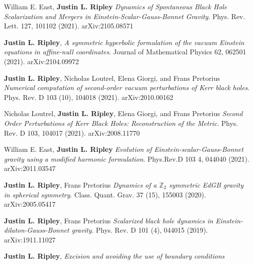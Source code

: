 \documentclass{my_cv}
\begin{document}
\begin{etaremune}
\item William E. East, {\bf Justin L. Ripley} 
   \emph{Dynamics of Spontaneous Black Hole Scalarization and Mergers
   in Einstein-Scalar-Gauss-Bonnet Gravity}.
   Phys. Rev. Lett. 127, 101102 (2021).
   arXiv:2105.08571
\item {\bf Justin L. Ripley}, 
   \emph{A symmetric hyperbolic formulation of the vacuum
      Einstein equations in affine-null coordinates}.
   Journal of Mathematical Physics 62, 062501 (2021).
   arXiv:2104.09972
\item {\bf Justin L. Ripley}, 
   Nicholas Loutrel, Elena Giorgi, and Frans Pretorius 
   \emph{Numerical computation of second-order vacuum perturbations of
      Kerr black holes}.
   Phys. Rev. D 103 (10), 104018 (2021). 
   arXiv:2010.00162
\item Nicholas Loutrel, {\bf Justin L. Ripley}, 
   Elena Giorgi, and Frans Pretorius 
   \emph{Second Order Perturbations of Kerr Black Holes: Reconstruction of
      the Metric}.
   Phys. Rev. D 103, 104017 (2021).
   arXiv:2008.11770
\item William E. East, {\bf Justin L. Ripley} 
   \emph{Evolution of Einstein-scalar-Gauss-Bonnet gravity
      using a modified harmonic formulation}.
   Phys.Rev.D 103 4, 044040 (2021).
   arXiv:2011.03547
\item {\bf Justin L. Ripley}, Frans Pretorius 
   \emph{Dynamics of a $\mathbb{Z}_2$ symmetric EdGB gravity in
      spherical symmetry}.
   Class. Quant. Grav. 37 (15), 155003 (2020).
   arXiv:2005.05417
\item {\bf Justin L. Ripley}, Frans Pretorius 
   \emph{Scalarized black hole dynamics in
      Einstein-dilaton-Gauss-Bonnet gravity}.
   Phys. Rev. D 101 (4), 044015 (2019).
   arXiv:1911.11027
\item {\bf Justin L. Ripley}, 
   \emph{Excision and avoiding the use of boundary conditions
}
\end{etaremune}
\end{document}
